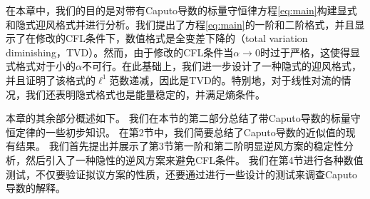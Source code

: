 在本章中，我们的目的是对带有Caputo导数的标量守恒律方程\eqref{eq:main}构建显式和隐式迎风格式并进行分析。我们提出了方程\eqref{eq:main}的一阶和二阶格式，并且显示了在修改的CFL条件下，数值格式是全变差下降的（total variation diminishing，TVD）。然而，由于修改的CFL条件当$\alpha \rightarrow 0$时过于严格，这使得显式格式对于小的$\alpha$不可行。在此基础上，我们进一步设计了一种隐式的迎风格式，并且证明了该格式的$\ell^1$范数递减，因此是TVD的。特别地，对于线性对流的情况，我们还表明隐式格式也是能量稳定的，并满足熵条件。

本章的其余部分概述如下。 我们在本节的第二部分总结了带Caputo导数的标量守恒定律的一些初步知识。 在第2节中，我们简要总结了Caputo导数的近似值的现有结果。 我们首先提出并展示了第3节第一阶和第二阶明显逆风方案的稳定性分析，然后引入了一种隐性的逆风方案来避免CFL条件。 我们在第4节进行各种数值测试，不仅要验证拟议方案的性质，还要通过进行一些设计的测试来调查Caputo导数的解释。

